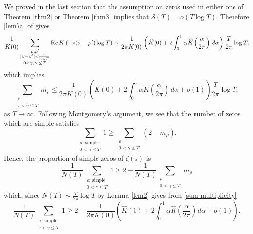 \documentclass{amsart}
\newcommand{\1}{\mathbbm{1}}
\theoremstyle{remark}
\numberwithin{equation}{section}
\begin{document}
We proved in the last section that the assumption on zeros used in either one of Theorem \ref{thm2} or Theorem \ref{thm3} implies that
$\mathcal{S}(T) = o(T\log{T})$. 
Therefore \eqref{lem7a} of  gives
\begin{equation*}
\frac1{K(0)} \sum_{\substack{\rho,\rho' \\ |\beta-\beta'|<\frac1{\log{T}} \\ 0<\gamma,\gamma'\le T}} {\rm Re}\,K\left(-i(\rho -\rho')\log{T}\right)
\sim \frac1{2\pi K(0)}\left(\widehat{K}(0) + 2\int_0^1 \alpha\widehat{K}\left(\frac{\alpha}{2\pi}\right)\, d\alpha \right)\frac{T}{2\pi}\log T,
\end{equation*}
which implies
\begin{equation}\label{sum-multiplicity}
\sum_{\substack{\rho \\ 0<\gamma\le T}} m_\rho
\le \frac1{2\pi K(0)}\left(\widehat{K}(0) + 2\int_0^1 \alpha\widehat{K}\left(\frac{\alpha}{2\pi}\right)\, d\alpha + o(1) \right)\frac{T}{2\pi}\log T,
\end{equation}
as $T\to \infty$.
Following Montgomery's \cite{Montgomery73} argument, we see that the number of zeros which are simple satisfies
\begin{equation*}
\sum_{\substack{\rho:\,\text{simple} \\ 0<\gamma\le T}} 1 \ge \sum_{\substack{\rho \\ 0<\gamma\le T}} (2-m_\rho).
\end{equation*}
Hence, the proportion of simple zeros of $\zeta(s)$ is
\begin{equation*}
\frac1{N(T)}\sum_{\substack{\rho:\,\text{simple} \\ 0<\gamma\le T}} 1 \ge 2 - \frac1{N(T)} \sum_{\substack{\rho \\ 0<\gamma\le T}} m_\rho
\end{equation*}
which, since $N(T)\sim \frac{T}{2\pi}\log T$ by Lemma \ref{lem2} gives from \eqref{sum-multiplicity} 
\begin{equation}\label{simple-proportion}
\frac1{N(T)}\sum_{\substack{\rho:\,\text{simple} \\ 0<\gamma\le T}} 1 \ge 2 - \frac1{2\pi K(0)} \left(\widehat{K}(0) + 2\int_0^1 \alpha\widehat{K}\left(\frac{\alpha}{2\pi}\right)\, d\alpha + o(1)\right).
\end{equation}


\end{document}
